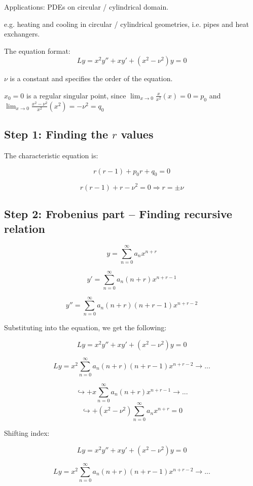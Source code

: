 Applications: PDEs on circular / cylindrical domain. 

e.g. heating and cooling in circular / cylindrical geometries, i.e. pipes and heat exchangers. 

\hfill

The equation format:
\begin{equation}
    \label{Bessel's Equation}
    Ly = x^2 y'' + xy' + \left(x^2 - \nu^2 \right) y = 0
\end{equation}

$\nu$ is a constant and specifies the order of the equation. 

$x_0 = 0$ is a regular singular point, since $\lim_{x \to 0} \frac{x}{x^2} (x) = 0 = p_0$ and $\lim_{x \to 0} \frac{x^2 - \nu^2}{x^2}(x^2) = - \nu^2 = q_0$

\subsection{Step 1: Finding the $r$ values}

The characteristic equation is:

$$r(r-1) + p_0 r + q_0 = 0$$

$$r(r-1) + r - \nu^2 = 0 \Rightarrow r = \pm \nu$$

\subsection{Step 2: Frobenius part -- Finding recursive relation}

$$y = \sum_{n = 0}^\infty a_n x^{n+r}$$

$$y' = \sum_{n =0}^{\infty} a_n (n+r)x^{n+r-1}$$

$$y'' = \sum_{n=0}^{\infty} a_n (n+r) (n+r-1) x^{n+r-2}$$

Substituting into the equation, we get the following:

$$Ly = x^2 y'' + xy' + \left(x^2 - \nu^2 \right) y = 0$$

$$Ly = x^2 \sum_{n=0}^{\infty} a_n (n+r) (n+r-1) x^{n+r-2} \rightarrow ...$$

$$ \hookrightarrow + x\sum_{n =0}^{\infty} a_n (n+r)x^{n+r-1} \rightarrow ...$$
$$ \hookrightarrow + \left(x^2 - \nu^2 \right) \sum_{n = 0}^\infty a_n x^{n+r} = 0$$

Shifting index:

$$Ly = x^2 y'' + xy' + \left(x^2 - \nu^2 \right) y = 0$$

$$Ly = x^2 \sum_{n=0}^{\infty} a_n (n+r) (n+r-1) x^{n+r-2} \rightarrow ...$$

